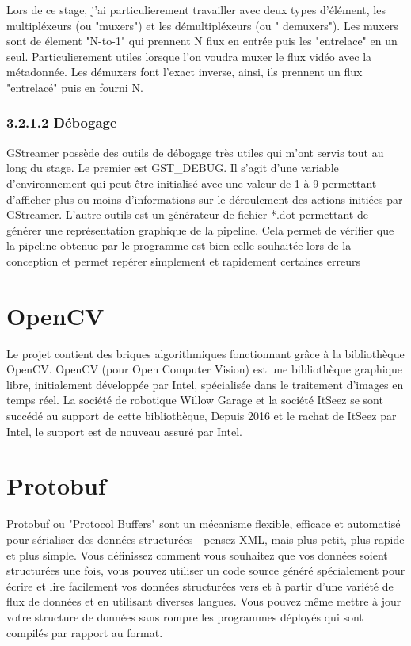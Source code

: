 Lors de ce stage, j'ai particulierement travailler avec deux types d'élément, les multipléxeurs (ou "muxers") et les démultipléxeurs (ou " demuxers"). Les muxers sont de élement "N-to-1" qui prennent N flux en entrée puis les "entrelace" en un seul. Particulierement utiles lorsque l'on voudra muxer le flux vidéo avec la métadonnée.
Les démuxers font l'exact inverse, ainsi, ils prennent un flux "entrelacé" puis en fourni N.



\subsubsection{3.2.1.2 Débogage}
GStreamer possède des outils de débogage très utiles qui m'ont servis tout au long du stage. Le premier est GST\_DEBUG. Il s'agit d'une variable d’environnement qui peut être initialisé avec une valeur de 1 à 9 permettant d'afficher plus ou moins d'informations sur le déroulement des actions initiées par GStreamer.
L'autre outils est un générateur de fichier *.dot permettant de générer une représentation graphique de la pipeline. Cela permet de vérifier que la pipeline obtenue par le programme est bien celle souhaitée lors de la conception et permet repérer simplement et rapidement certaines erreurs


\section{OpenCV}
Le projet contient des briques algorithmiques fonctionnant grâce à la bibliothèque OpenCV. OpenCV (pour Open Computer Vision) est une bibliothèque graphique libre, initialement développée par Intel, spécialisée dans le traitement d'images en temps réel. La société de robotique Willow Garage et la société ItSeez se sont succédé au support de cette bibliothèque, Depuis 2016 et le rachat de ItSeez par Intel, le support est de nouveau assuré par Intel.


\section{Protobuf }
Protobuf ou "Protocol Buffers" sont un mécanisme flexible, efficace et automatisé pour sérialiser des données structurées - pensez XML, mais plus petit, plus rapide et plus simple. Vous définissez comment vous souhaitez que vos données soient structurées une fois, vous pouvez utiliser un code source généré spécialement pour écrire et lire facilement vos données structurées vers et à partir d'une variété de flux de données et en utilisant diverses langues. Vous pouvez même mettre à jour votre structure de données sans rompre les programmes déployés qui sont compilés par rapport au format.

